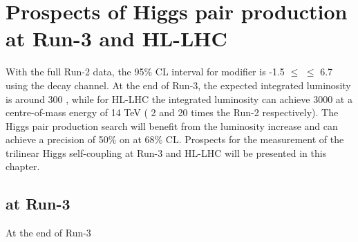 \newpage
\chapter{Prospects of Higgs pair production at Run-3 and HL-LHC}
\label{HL-LHC}

With the full Run-2 data, the 95\% CL interval for \kl modifier is -1.5 $\leq$ \kl $\leq$ 6.7 using the \HHyybb decay channel. At the end of Run-3, the expected integrated luminosity is around 300 \ifb, while for HL-LHC the integrated luminosity can achieve 3000 \ifb at a centre-of-mass energy of 14 TeV ( 2 and 20 times the Run-2 respectively). The Higgs pair production search will benefit from the luminosity increase and can achieve a precision of 50\% on \kl at 68\% CL. Prospects for the measurement of the trilinear Higgs self-coupling at Run-3 and HL-LHC will be presented in this chapter. 

\section{\HHyybb at Run-3}
\label{HL-LHC:Run-3}

At the end of Run-3 